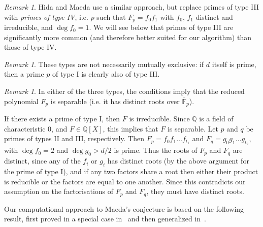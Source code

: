 \documentclass[11pt]{article}
\theoremstyle{plain}
\theoremstyle{definition}
\theoremstyle{remark}
\newtheorem{remark}[theorem]{Remark}
\numberwithin{equation}{section}
\newcommand{\FF}{\mathbb{F}}
\newcommand{\QQ}{\mathbb{Q}}
\begin{document}
\begin{remark}\label{rmk:type4}
  Hida and Maeda use a similar approach, but replace primes of type III with
  \emph{primes of type IV}, i.e. $p$ such that $F_p=f_0f_1$ with $f_0$, $f_1$
  distinct and irreducible, and $\deg f_0=1$.  We will see below that primes
  of type III are significantly more common (and therefore better suited for
  our algorithm) than those of type IV.
\end{remark}

\begin{remark}
These types are not necessarily mutually exclusive: if $d$ itself is
prime, then a prime $p$ of type I is clearly also of type III.
\end{remark}

\begin{remark}
In either of the three types, the conditions imply that the reduced polynomial
$F_p$ is separable (i.e. it has distinct roots over $\overline{\FF}_p$).

  If there exists a prime of type I, then $F$ is irreducible. Since $\QQ$ is a field of
  characteristic 0, and $F \in \QQ[X]$, this implies that $F$ is separable. Let $p$ and 
  $q$ be primes of types II and III, respectively. Then $F_p = f_0 f_1 \ldots f_{t_1}$
  and $F_q = g_0 g_1 \ldots g_{t_2}$, with $\deg f_0 = 2$ and $\deg g_0 > d/2$ is prime.
  Thus the roots of $F_p$ and $F_q$ are distinct, since any of the $f_i$ or $g_i$ has
  distinct roots (by the above argument for the prime of type I), and if any two factors
  share a root then either their product is reducible or the factors are equal to one
  another. Since this contradicts our assumption on the factorisations of $F_p$ and
  $F_q$, they must have distinct roots.
\end{remark}

Our computational approach to Maeda's conjecture is based on the following
result, first proved in a special case in~\cite{Buzzard} and then generalized
in~\cite{ConreyFarmer}.
\end{document}
